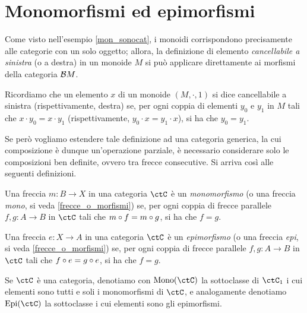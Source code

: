 \section{Monomorfismi ed epimorfismi}\label{sec_monoepi}

Come visto nell'esempio \ref{mon_sonocat}, i monoidi corrispondono precisamente alle categorie con un solo oggetto; allora,
la definizione di elemento \emph{cancellabile a sinistra} (o a destra) in un monoide \(M\) si può applicare direttamente ai morfismi della categoria \(\mathcal{B} M\).
\begin{definition}\label{def_elem_cancel}
	Ricordiamo che un elemento \(x\) di un monoide \((M, \cdot, 1)\) si dice cancellabile a sinistra (rispettivamente, destra) se,	per ogni coppia di elementi \(y_0\) e \(y_1\) in \(M\) tali che \(x \cdot y_0 = x \cdot y_1\) (rispettivamente, \(y_0 \cdot x = y_1 \cdot x\)), si ha che \(y_0 = y_1\).
\end{definition}
Se però vogliamo estendere tale definizione ad una categoria generica, la cui composizione è dunque un'operazione parziale, è necessario considerare solo le composizioni ben definite, ovvero tra frecce consecutive. Si arriva così alle seguenti definizioni.
\begin{definition}[Monomorfismo]\label{def_Mono}
	Una freccia \(m \colon B \to X\) in una categoria \(\ctC\) è un \emph{monomorfismo} (o una freccia \emph{mono}, si veda \ref{frecce_o_morfismi}) se,	per ogni coppia di frecce parallele \(f, g \colon A \to B\) in \(\ctC\) tali che \(m \circ f = m \circ g\), si ha che \(f = g\).
\end{definition}
\begin{definition}[Epimorfismo]\label{def_Epi}
	Una freccia \(e \colon X \to A\) in una categoria \(\ctC\) è un \emph{epimorfismo} (o una freccia \emph{epi}, si veda \ref{frecce_o_morfismi}) se,	per ogni coppia di frecce parallele \(f, g \colon A \to B\) in \(\ctC\) tali che \(f \circ e = g \circ e\), si ha che \(f = g\).
\end{definition}
\begin{notation}\label{not_monoC_epiC}
Se $\ctC$ è una categoria, denotiamo con $\Mono[\ctC]$ la sottoclasse di $\ctC_1$ i cui elementi sono tutti e soli i monomorfismi di $\ctC$, e analogamente denotiamo $\Epi[\ctC]$ la sottoclasse i cui elementi sono gli epimorfismi.
\end{notation}

